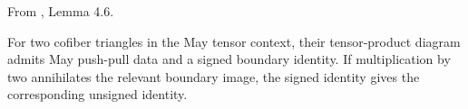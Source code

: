 \begin{theorem}
\label{sem:Literature:may-push-pull}
From \cite{May01}, Lemma 4.6.\par

For two cofiber triangles in the May tensor context, their tensor-product diagram admits May push-pull data and a signed boundary identity. If multiplication by two annihilates the relevant boundary image, the signed identity gives the corresponding unsigned identity.
\end{theorem}


